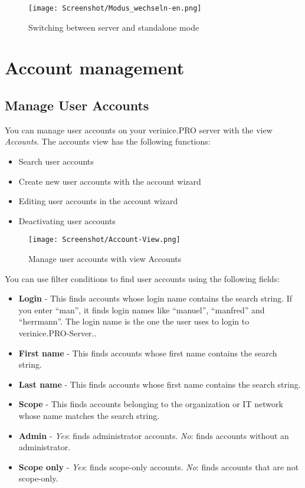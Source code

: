\documentclass[a4paper,10pt]{book}
\begin{document}
\begin{figure}[htb!]
  \centering
  \texttt{[image: Screenshot/Modus\_wechseln-en.png]}
  \caption{\label{Switching between server and standalone mode} Switching between server and standalone mode}
\end{figure}

\section{Account management} \label{sec:account-management}
\subsection{Manage User Accounts}

You can manage user accounts on your verinice.PRO server with the view \textit{Accounts}. The accounts view has the following functions:
\begin{itemize}
\item Search user accounts
\item Create new user accounts with the account wizard
\item Editing user accounts in the account wizard
\item Deactivating user accounts
\end{itemize}

\begin{figure}[htb!]
  \centering
  \texttt{[image: Screenshot/Account-View.png]}
  \caption{\label{Manage user accounts with view Accounts} Manage user accounts with view Accounts}
\end{figure}

You can use filter conditions to find user accounts using the following fields:
\begin{itemize}
\item \textbf{Login} - This finds accounts whose login name contains the search string. If you enter ``man'', it finds login names like ``manuel'', ``manfred'' and ``herrmann''. The login name is the one the user uses to login to verinice.\textsc{PRO}-Server..
\item \textbf{First name} - This finds accounts whose first name contains the search string.
\item \textbf{Last name} - This finds accounts whose first name contains the search string.
\item \textbf{Scope} - This finds accounts belonging to the organization or IT network whose name matches the search string.
\item \textbf{Admin} - \textit{Yes}: finds administrator accounts. \textit{No}: finds accounts without an administrator.
\item \textbf{Scope only} - \textit{Yes}: finds scope-only accounts. \textit{No}: finds accounts that are not scope-only.
\end{itemize}
\end{document}
